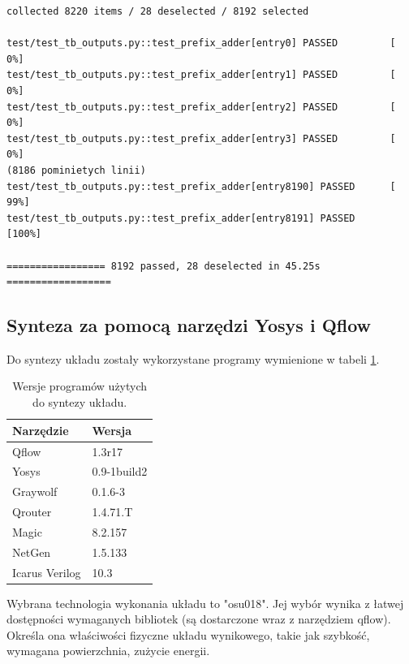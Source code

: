 \documentclass[12pt,oneside,reqno]{article}
\begin{document}
\begin{lstlisting}[caption={Wynik wywołania testów pytest dla modułu prefix\_adder.}, label={lst:pytest-run-pg}]
collected 8220 items / 28 deselected / 8192 selected                    

test/test_tb_outputs.py::test_prefix_adder[entry0] PASSED         [  0%]
test/test_tb_outputs.py::test_prefix_adder[entry1] PASSED         [  0%]
test/test_tb_outputs.py::test_prefix_adder[entry2] PASSED         [  0%]
test/test_tb_outputs.py::test_prefix_adder[entry3] PASSED         [  0%]
(8186 pominietych linii)
test/test_tb_outputs.py::test_prefix_adder[entry8190] PASSED      [ 99%]
test/test_tb_outputs.py::test_prefix_adder[entry8191] PASSED      [100%]

================= 8192 passed, 28 deselected in 45.25s ==================
\end{lstlisting}

\clearpage
\subsection{Synteza za pomocą narzędzi Yosys i Qflow}


Do syntezy układu zostały wykorzystane programy wymienione w tabeli \ref{program-versions}.

\begin{table}[H]
\centering
\caption{Wersje programów użytych do syntezy układu.}
\begin{tabular}{l|l}
\textbf{Narzędzie} & \textbf{Wersja} \\ \hline
Qflow              & 1.3r17          \\ \hline
Yosys              & 0.9-1build2     \\ \hline
Graywolf           & 0.1.6-3         \\ \hline
Qrouter            & 1.4.71.T        \\ \hline
Magic              & 8.2.157         \\ \hline
NetGen             & 1.5.133         \\ \hline
Icarus Verilog     & 10.3   
\end{tabular}
\label{program-versions}
\end{table}

Wybrana technologia wykonania układu to "osu018". Jej wybór wynika z łatwej dostępności wymaganych bibliotek (są dostarczone wraz z narzędziem qflow). Określa ona właściwości fizyczne układu wynikowego, takie jak szybkość, wymagana powierzchnia, zużycie energii.
\end{document}

